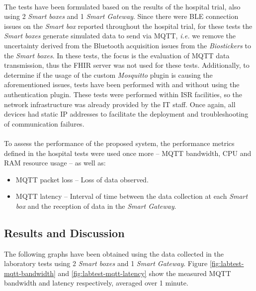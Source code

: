 \paragraph{} The tests have been formulated based on the results of the hospital trial, also using 2 \textit{Smart boxes} and 1 \textit{Smart Gateway}. Since there were \acs{BLE} connection issues on the \textit{Smart box} reported throughout the hospital trial, for these tests the \textit{Smart boxes} generate simulated data to send via \acs{MQTT}, \textit{i.e.} we remove the uncertainty derived from the Bluetooth acquisition issues from the \textit{Biostickers} to the \textit{Smart boxes}. In these tests, the focus is the evaluation of \acs{MQTT} data transmission, thus the \acs{FHIR} server was not used for these tests. Additionally, to determine if the usage of the custom \textit{Mosquitto} plugin is causing the aforementioned issues, tests have been performed with and without using the authentication plugin. These tests were performed within \acs{ISR} facilities, so the network infrastructure was already provided by the \acs{IT} staff. Once again, all devices had static \acs{IP} addresses to facilitate the deployment and troubleshooting of communication failures.

\paragraph{} To assess the performance of the proposed system, the performance metrics defined in the hospital tests were used once more -- \acs{MQTT} bandwidth, \acs{CPU} and \acs{RAM} resource usage -- as well as:

\begin{itemize} 
    \item \acs{MQTT} packet loss -- Loss of data observed.
    \item \acs{MQTT} latency -- Interval of time between the data collection at each \textit{Smart box} and the reception of data in the \textit{Smart Gateway}.
\end{itemize}


\subsection{Results and Discussion}

The following graphs have been obtained using the data collected in the laboratory tests using 2 \textit{Smart boxes} and 1 \textit{Smart Gateway}. Figure \ref{fig:labtest-mqtt-bandwidth} and \ref{fig:labtest-mqtt-latency} show the measured \acs{MQTT} bandwidth and latency respectively, averaged over 1 minute. 

